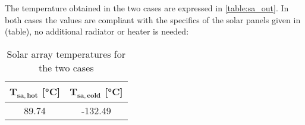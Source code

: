 The temperature obtained in the two cases are expressed in \autoref{table:sa_out}. 
In both cases the values are compliant with the specifics of the solar panels given in \mref (table), no additional radiator or heater is needed:

\begin{table}[H]
    \renewcommand{\arraystretch}{1.3}
    \centering
    \begin{tabular}{|c|c|}
        \hline
        $\boldsymbol{T_{sa,hot}}$ [°C] & $\boldsymbol{T_{sa,cold}}$ [°C]  \\
        \hline
        89.74 & -132.49 \\
        \hline
    \end{tabular}
    \caption{Solar array temperatures for the two cases}
    \label{table:sa_out}
\end{table}
